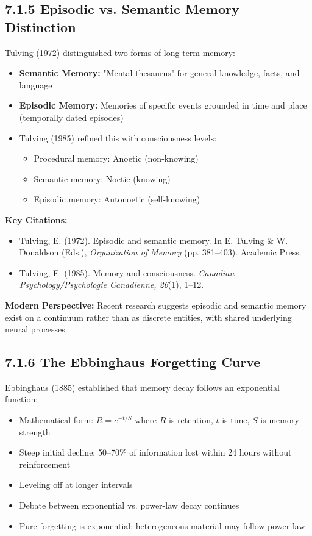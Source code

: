 \documentclass[11pt,letterpaper]{article}
\begin{document}
\subsection{7.1.5 Episodic vs. Semantic Memory Distinction}

Tulving (1972) distinguished two forms of long-term memory:

\begin{itemize}[leftmargin=*]
    \item \textbf{Semantic Memory:} "Mental thesaurus" for general knowledge, facts, and language
    \item \textbf{Episodic Memory:} Memories of specific events grounded in time and place (temporally dated episodes)
    \item Tulving (1985) refined this with consciousness levels:
    \begin{itemize}
        \item Procedural memory: Anoetic (non-knowing)
        \item Semantic memory: Noetic (knowing)
        \item Episodic memory: Autonoetic (self-knowing)
    \end{itemize}
\end{itemize}

\textbf{Key Citations:}
\begin{itemize}[leftmargin=*]
    \item Tulving, E. (1972). Episodic and semantic memory. In E. Tulving \& W. Donaldson (Eds.), \textit{Organization of Memory} (pp. 381--403). Academic Press.
    \item Tulving, E. (1985). Memory and consciousness. \textit{Canadian Psychology/Psychologie Canadienne, 26}(1), 1--12.
\end{itemize}

\textbf{Modern Perspective:} Recent research suggests episodic and semantic memory exist on a continuum rather than as discrete entities, with shared underlying neural processes.

\subsection{7.1.6 The Ebbinghaus Forgetting Curve}

Ebbinghaus (1885) established that memory decay follows an exponential function:

\begin{itemize}[leftmargin=*]
    \item Mathematical form: $R = e^{-t/S}$ where $R$ is retention, $t$ is time, $S$ is memory strength
    \item Steep initial decline: 50--70\% of information lost within 24 hours without reinforcement
    \item Leveling off at longer intervals
    \item Debate between exponential vs. power-law decay continues
    \item Pure forgetting is exponential; heterogeneous material may follow power law
\end{itemize}
\end{document}
